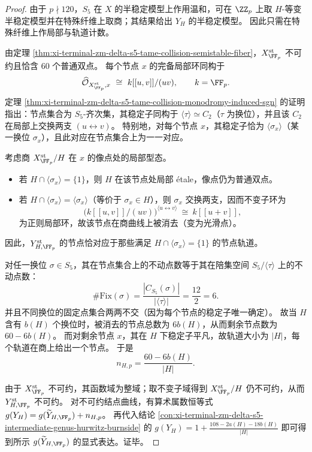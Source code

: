 \begin{proof}
由于 \(p\nmid 120\)，\(S_5\) 在 \(X\) 的半稳定模型上作用温和，可在 \(\ZZ_p\) 上取 \(H\)-等变半稳定模型并在特殊纤维上取商；其结果给出 \(Y_H\) 的半稳定模型。
因此只需在特殊纤维上作局部与轨道计数。
\par
由定理 \ref{thm:xi-terminal-zm-delta-s5-tame-collision-semistable-fiber}，\(X^{\mathrm{st}}_{\FF_p}\) 不可约且恰含 \(60\) 个普通双点。
每个节点 \(x\) 的完备局部环同构于
\[
\widehat{\mathcal O}_{X^{\mathrm{st}}_{\FF_p},x}\ \cong\ k[[u,v]]/(uv),\qquad k=\FF_p.
\]
定理 \ref{thm:xi-terminal-zm-delta-s5-tame-collision-monodromy-induced-sgn} 的证明指出：节点集合为 \(S_5\)-齐次集，其稳定子同构于 \(\langle\tau\rangle\simeq C_2\)（\(\tau\) 为换位），并且该 \(C_2\) 在局部上交换两支 \((u\leftrightarrow v)\)。
特别地，对每个节点 \(x\)，其稳定子恰为 \(\langle\sigma_x\rangle\)（某一换位 \(\sigma_x\)），且此对应在节点集合上为一一对应。
\par
考虑商 \(X^{\mathrm{st}}_{\FF_p}/H\) 在 \(x\) 的像点处的局部型态。
\begin{itemize}
  \item 若 \(H\cap \langle\sigma_x\rangle=\{1\}\)，则 \(H\) 在该节点处局部 \'etale，像点仍为普通双点。
  \item 若 \(H\cap \langle\sigma_x\rangle=\langle\sigma_x\rangle\)（等价于 \(\sigma_x\in H\)），则 \(\sigma_x\) 交换两支，因而不变子环为
  \[
  \bigl(k[[u,v]]/(uv)\bigr)^{\langle u\leftrightarrow v\rangle}\ \cong\ k[[u+v]],
  \]
  为正则局部环，故该节点在商曲线上被消去（变为光滑点）。
\end{itemize}
因此，\(Y^{\mathrm{st}}_{H,\FF_p}\) 的节点恰对应于那些满足 \(H\cap\langle\sigma_x\rangle=\{1\}\) 的节点轨道。
\par
对任一换位 \(\sigma\in S_5\)，其在节点集合上的不动点数等于其在陪集空间 \(S_5/\langle\tau\rangle\) 上的不动点数：
\[
\#\mathrm{Fix}(\sigma)=\frac{|C_{S_5}(\sigma)|}{|\langle\tau\rangle|}
=\frac{12}{2}=6.
\]
并且不同换位的固定点集合两两不交（因为每个节点的稳定子唯一确定）。
故当 \(H\) 含有 \(b(H)\) 个换位时，被消去的节点总数为 \(6b(H)\)，从而剩余节点数为 \(60-6b(H)\)。
而对剩余节点 \(x\)，其在 \(H\) 下稳定子平凡，故轨道大小为 \(|H|\)，每个轨道在商上给出一个节点。
于是
\[
n_{H,p}=\frac{60-6b(H)}{|H|}.
\]
\par
由于 \(X^{\mathrm{st}}_{\FF_p}\) 不可约，其函数域为整域；取不变子域得到 \(X^{\mathrm{st}}_{\FF_p}/H\) 仍不可约，从而 \(Y^{\mathrm{st}}_{H,\FF_p}\) 不可约。
对不可约结点曲线，有算术属数恒等式
\(
g(Y_H)=g(\widetilde Y_{H,\FF_p})+n_{H,p}
\)。
再代入结论 \ref{con:xi-terminal-zm-delta-s5-intermediate-genus-hurwitz-burnside} 的
\(
g(Y_H)=1+\frac{108-2a(H)-18b(H)}{|H|}
\)
即可得到所示 \(g(\widetilde Y_{H,\FF_p})\) 的显式表达。证毕。
\end{proof}

